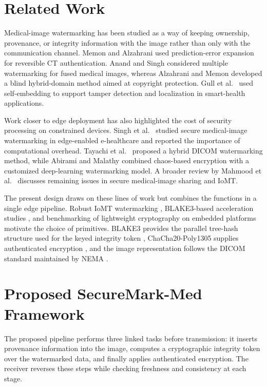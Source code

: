 \documentclass[runningheads]{llncs}
\begin{document}
\section{Related Work}

Medical-image watermarking has been studied as a way of keeping ownership, provenance, or integrity information with the image rather than only with the communication channel. Memon and Alzahrani \cite{memon2020prediction} used prediction-error expansion for reversible CT authentication. Anand and Singh \cite{anand2021health} considered multiple watermarking for fused medical images, whereas Alzahrani and Memon \cite{alzahrani2021blind} developed a blind hybrid-domain method aimed at copyright protection. Gull et al.\ \cite{gull2021self} used self-embedding to support tamper detection and localization in smart-health applications.

Work closer to edge deployment has also highlighted the cost of security processing on constrained devices. Singh et al.\ \cite{singh2023robust} studied secure medical-image watermarking in edge-enabled e-healthcare and reported the importance of computational overhead. Tayachi et al.\ \cite{tayachi2023hybrid} proposed a hybrid DICOM watermarking method, while Abirami and Malathy \cite{abirami2024secured} combined chaos-based encryption with a customized deep-learning watermarking model. A broader review by Mahmood et al.\ \cite{mahmood2025secure} discusses remaining issues in secure medical-image sharing and IoMT.

The present design draws on these lines of work but combines the functions in a single edge pipeline. Robust IoMT watermarking \cite{singh2025ensuring}, BLAKE3-based acceleration studies \cite{jasim2025optimizing}, and benchmarking of lightweight cryptography on embedded platforms \cite{buhler2022benchmarking} motivate the choice of primitives. BLAKE3 provides the parallel tree-hash structure used for the keyed integrity token \cite{oconnor2020blake3}, ChaCha20-Poly1305 supplies authenticated encryption \cite{nir2018chacha20}, and the image representation follows the DICOM standard maintained by NEMA \cite{nema2024dicom}.

\section{Proposed SecureMark-Med Framework}

The proposed pipeline performs three linked tasks before transmission: it inserts provenance information into the image, computes a cryptographic integrity token over the watermarked data, and finally applies authenticated encryption. The receiver reverses these steps while checking freshness and consistency at each stage.
\end{document}
